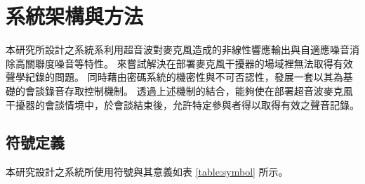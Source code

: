 \chapter{系統架構與方法}

    本研究所設計之系統系利用超音波對麥克風造成的非線性響應輸出與自適應噪音消除高關聯度噪音等特性。
來嘗試解決在部署麥克風干擾器的場域裡無法取得有效聲學紀錄的問題。
同時藉由密碼系統的機密性與不可否認性，發展一套以其為基礎的會談錄音存取控制機制。
透過上述機制的結合，能夠使在部署超音波麥克風干擾器的會談情境中，於會談結束後，允許特定參與者得以取得有效之聲音記錄。


\section{符號定義}

    本研究設計之系統所使用符號與其意義如表 \ref{table:symbol} 所示。

